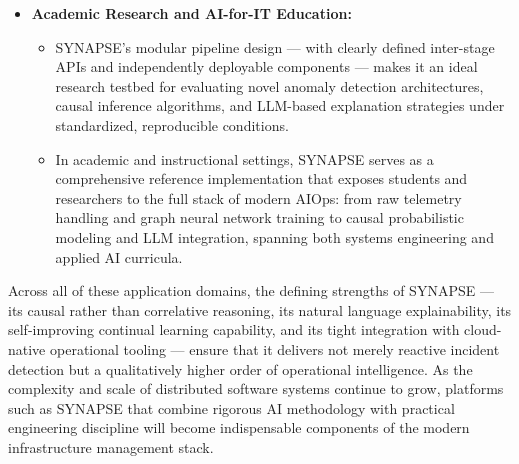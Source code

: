 \begin{itemize}
    \item \textbf{Academic Research and AI-for-IT Education:}
    \begin{itemize}
        \item SYNAPSE's modular pipeline design — with clearly defined inter-stage APIs and independently deployable components — makes it an ideal research testbed for evaluating novel anomaly detection architectures, causal inference algorithms, and LLM-based explanation strategies under standardized, reproducible conditions.
        \item In academic and instructional settings, SYNAPSE serves as a comprehensive reference implementation that exposes students and researchers to the full stack of modern AIOps: from raw telemetry handling and graph neural network training to causal probabilistic modeling and LLM integration, spanning both systems engineering and applied AI curricula.
    \end{itemize}

\end{itemize}

\hspace*{0.3in} Across all of these application domains, the defining strengths of SYNAPSE — its causal rather than correlative reasoning, its natural language explainability, its self-improving continual learning capability, and its tight integration with cloud-native operational tooling — ensure that it delivers not merely reactive incident detection but a qualitatively higher order of operational intelligence. As the complexity and scale of distributed software systems continue to grow, platforms such as SYNAPSE that combine rigorous AI methodology with practical engineering discipline will become indispensable components of the modern infrastructure management stack.\\
